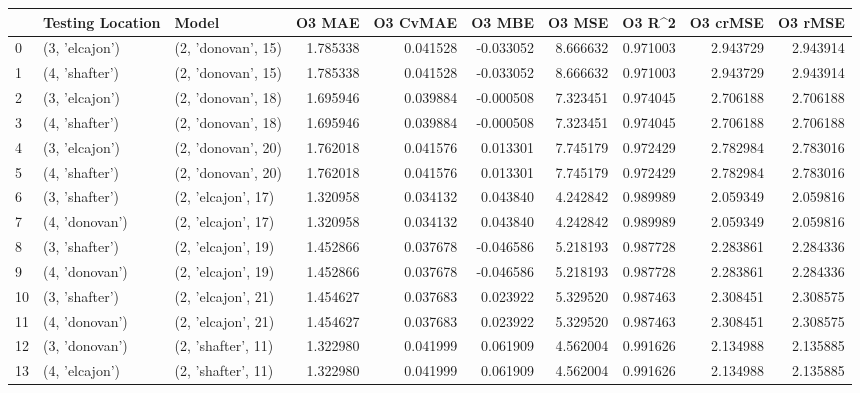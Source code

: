 \begin{tabular}{lllrrrrrrr}
\toprule
{} & Testing Location &               Model &    O3 MAE &  O3 CvMAE &    O3 MBE &     O3 MSE &    O3 R\textasciicircum2 &  O3 crMSE &   O3 rMSE \\
\midrule
0  &   (3, 'elcajon') &  (2, 'donovan', 15) &  1.785338 &  0.041528 & -0.033052 &   8.666632 &  0.971003 &  2.943729 &  2.943914 \\
1  &   (4, 'shafter') &  (2, 'donovan', 15) &  1.785338 &  0.041528 & -0.033052 &   8.666632 &  0.971003 &  2.943729 &  2.943914 \\
2  &   (3, 'elcajon') &  (2, 'donovan', 18) &  1.695946 &  0.039884 & -0.000508 &   7.323451 &  0.974045 &  2.706188 &  2.706188 \\
3  &   (4, 'shafter') &  (2, 'donovan', 18) &  1.695946 &  0.039884 & -0.000508 &   7.323451 &  0.974045 &  2.706188 &  2.706188 \\
4  &   (3, 'elcajon') &  (2, 'donovan', 20) &  1.762018 &  0.041576 &  0.013301 &   7.745179 &  0.972429 &  2.782984 &  2.783016 \\
5  &   (4, 'shafter') &  (2, 'donovan', 20) &  1.762018 &  0.041576 &  0.013301 &   7.745179 &  0.972429 &  2.782984 &  2.783016 \\
6  &   (3, 'shafter') &  (2, 'elcajon', 17) &  1.320958 &  0.034132 &  0.043840 &   4.242842 &  0.989989 &  2.059349 &  2.059816 \\
7  &   (4, 'donovan') &  (2, 'elcajon', 17) &  1.320958 &  0.034132 &  0.043840 &   4.242842 &  0.989989 &  2.059349 &  2.059816 \\
8  &   (3, 'shafter') &  (2, 'elcajon', 19) &  1.452866 &  0.037678 & -0.046586 &   5.218193 &  0.987728 &  2.283861 &  2.284336 \\
9  &   (4, 'donovan') &  (2, 'elcajon', 19) &  1.452866 &  0.037678 & -0.046586 &   5.218193 &  0.987728 &  2.283861 &  2.284336 \\
10 &   (3, 'shafter') &  (2, 'elcajon', 21) &  1.454627 &  0.037683 &  0.023922 &   5.329520 &  0.987463 &  2.308451 &  2.308575 \\
11 &   (4, 'donovan') &  (2, 'elcajon', 21) &  1.454627 &  0.037683 &  0.023922 &   5.329520 &  0.987463 &  2.308451 &  2.308575 \\
12 &   (3, 'donovan') &  (2, 'shafter', 11) &  1.322980 &  0.041999 &  0.061909 &   4.562004 &  0.991626 &  2.134988 &  2.135885 \\
13 &   (4, 'elcajon') &  (2, 'shafter', 11) &  1.322980 &  0.041999 &  0.061909 &   4.562004 &  0.991626 &  2.134988 &  2.135885 \\

\end{tabular}
